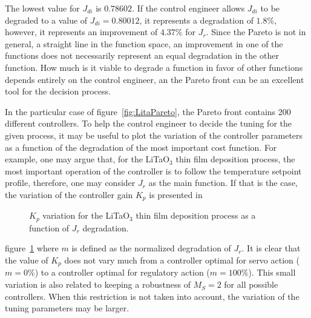 The lowest value for $J_{di}$ is $0.78602$. If the control engineer allows $J_{di}$ to be degraded to a value of $J_{di}=0.80012$, it represents a degradation of $1.8\%$, however, it represents an improvement of $4.37\%$ for $J_r$. Since the Pareto is not in general, a straight line in the function space, an improvement in one of the functions does not necessarily represent an equal degradation in the other function. How much is it viable to degrade a function in favor of other functions depends entirely on the control engineer, an the Pareto front can be an excellent tool for the decision process.

In the particular case of figure~\ref{fig:LitaPareto}, the Pareto front contains 200 different controllers. To help the control engineer to decide the tuning for the given process, it may be useful to plot the variation of the controller parameters as a function of the degradation of the most important cost function. For example, one may argue that, for the  LiTaO$_3$ thin film deposition process, the most important operation of the controller is to follow the temperature setpoint profile, therefore, one may consider $J_r$ as the main function. If that is the case, the variation  of the controller gain $K_p$ is presented in %
%
\begin{figure}
	\centering
	\caption{$K_p$ variation for the LiTaO$_3$ thin film deposition process as a function of $J_r$ degradation.}
	\label{fig:LitaParetoKp}
\end{figure}
%
figure~\ref{fig:LitaParetoKp} where $m$ is defined as the normalized degradation of $J_{r}$. It is clear that the value of $K_p$ does not vary much from a controller optimal for servo action ($m=0\%$) to a controller optimal for regulatory action ($m=100\%$). This small variation is also related to keeping a robustness of $M_S = 2$ for all possible controllers. When this restriction is not taken into account, the variation of the tuning parameters may be larger.

